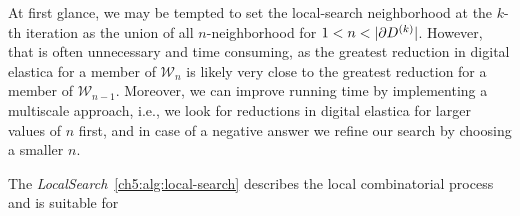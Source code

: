  At first glance, we may be tempted to set the local-search neighborhood at the $k$-th iteration as the union of all $n$-neighborhood for $1<n<|\partial \Ds^{(k)}|$. However, that is often unnecessary and time consuming, as the greatest reduction in digital elastica for a member of $\mathcal{W}_n$ is likely very close to the greatest reduction for a member of $\mathcal{W}_{n-1}$. Moreover, we can improve running time by implementing a multiscale approach, i.e., we look for reductions in digital elastica for larger values of $n$ first, and in case of a negative answer we refine our search by choosing a smaller $n$.

The \emph{LocalSearch}~\cref{ch5:alg:local-search} describes the local combinatorial process and is suitable for  

	


